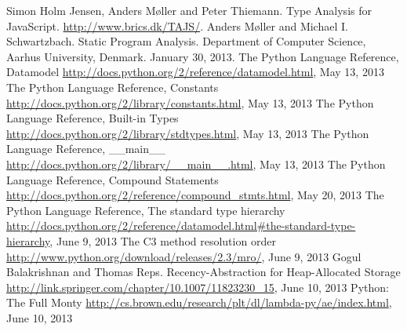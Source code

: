 \begin{thebibliography}{8}

 Simon Holm Jensen, Anders M\o ller and Peter Thiemann. Type Analysis for JavaScript. \url{http://www.brics.dk/TAJS/}.
 Anders M\o ller and Michael I. Schwartzbach. Static Program Analysis. Department of Computer Science, Aarhus University, Denmark. January 30, 2013.
 The Python Language Reference, Datamodel \url{http://docs.python.org/2/reference/datamodel.html}, May 13, 2013
 The Python Language Reference, Constants \url{http://docs.python.org/2/library/constants.html}, May 13, 2013
 The Python Language Reference, Built-in Types \url{http://docs.python.org/2/library/stdtypes.html}, May 13, 2013
 The Python Language Reference, \_\_main\_\_ \url{http://docs.python.org/2/library/__main__.html}, May 13, 2013
 The Python Language Reference, Compound Statements \url{http://docs.python.org/2/reference/compound_stmts.html}, May 20, 2013
 The Python Language Reference, The standard type hierarchy \url{http://docs.python.org/2/reference/datamodel.html#the-standard-type-hierarchy}, June 9, 2013
 The C3 method resolution order \url{http://www.python.org/download/releases/2.3/mro/}, June 9, 2013
 Gogul Balakrishnan and Thomas Reps. Recency-Abstraction for Heap-Allocated Storage \url{http://link.springer.com/chapter/10.1007/11823230_15}, June 10, 2013
 Python: The Full Monty \url{http://cs.brown.edu/research/plt/dl/lambda-py/ae/index.html}, June 10, 2013
	
\end{thebibliography}
